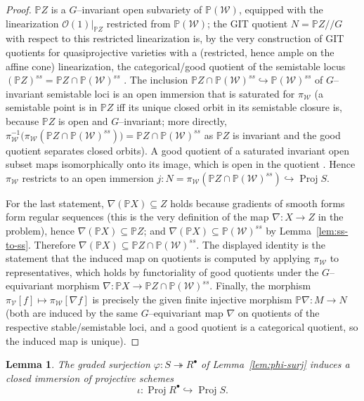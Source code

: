 \documentclass{amsart}
\newtheorem{lemma}{Lemma}
\theoremstyle{definition}
\DeclareMathOperator{\Proj}{Proj}
\newcommand{\PP}{\mathbb{P}}
\newcommand{\nab}{\nabla}
\begin{document}
\begin{proof}
$\PP Z$ is a $G$--invariant open subvariety of $\PP(\mathcal W)$, equipped with the
linearization $\mathcal O(1)|_{\PP Z}$ restricted from $\PP(\mathcal W)$; the GIT quotient
$N=\PP Z/\!/G$ with respect to this restricted linearization is, by the very construction of
GIT quotients for quasiprojective varieties with a (restricted, hence ample on the affine
cone) linearization, the categorical/good quotient of the semistable locus
$(\PP Z)^{ss}=\PP Z\cap\PP(\mathcal W)^{ss}$ \cite[Ch.~1, \S 4, Converse~1.12 and the
discussion of quotients of invariant opens]{MFK}. The inclusion
$\PP Z\cap\PP(\mathcal W)^{ss}\hookrightarrow\PP(\mathcal W)^{ss}$ of $G$--invariant
semistable loci is an open immersion that is saturated for $\pi_{\mathcal W}$ (a semistable
point is in $\PP Z$ iff its unique closed orbit in its semistable closure is, because $\PP Z$
is open and $G$--invariant; more directly, $\pi_{\mathcal W}^{-1}\big(\pi_{\mathcal W}(\PP Z\cap
\PP(\mathcal W)^{ss})\big)=\PP Z\cap\PP(\mathcal W)^{ss}$ as $\PP Z$ is invariant and the good
quotient separates closed orbits). A good quotient of a saturated invariant open subset maps
isomorphically onto its image, which is open in the quotient \cite[Ch.~1, \S 2, Thm.~1.10 and
Property~(iii) of good quotients]{MFK}. Hence $\pi_{\mathcal W}$ restricts to an open immersion
$j\colon N=\pi_{\mathcal W}(\PP Z\cap\PP(\mathcal W)^{ss})\hookrightarrow\Proj S$.

For the last statement, $\nab(\PP X)\subseteq Z$ holds because gradients of smooth forms form
regular sequences (this is the very definition of the map $\nab\colon X\to Z$ in the problem),
hence $\nab(\PP X)\subseteq\PP Z$; and $\nab(\PP X)\subseteq\PP(\mathcal W)^{ss}$ by
Lemma~\ref{lem:ss-to-ss}. Therefore $\nab(\PP X)\subseteq\PP Z\cap\PP(\mathcal W)^{ss}$.
The displayed identity is the statement that the induced map on quotients is computed by
applying $\pi_{\mathcal W}$ to representatives, which holds by functoriality of good quotients
under the $G$--equivariant morphism $\nab\colon\PP X\to \PP Z\cap\PP(\mathcal W)^{ss}$. Finally,
the morphism $\pi_{\mathcal V}[f]\mapsto\pi_{\mathcal W}[\nab f]$ is precisely the given finite
injective morphism $\PP\nab\colon M\to N$ (both are induced by the same $G$--equivariant map
$\nab$ on quotients of the respective stable/semistable loci, and a good quotient is a
categorical quotient, so the induced map is unique).
\end{proof}

\begin{lemma}\label{lem:closedimm}
The graded surjection $\varphi\colon S\twoheadrightarrow R^{\bullet}$ of
Lemma~\ref{lem:phi-surj} induces a closed immersion of projective schemes
\[
\iota\colon \Proj R^{\bullet}\hookrightarrow \Proj S .
\]
\end{lemma}
\end{document}
